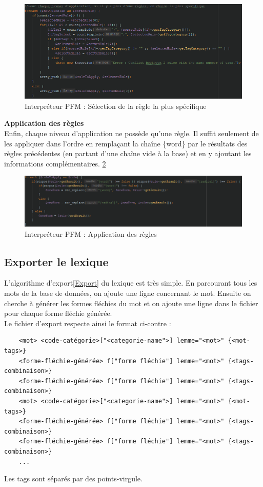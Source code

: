 \documentclass[12pt,a4paper]{article}
\begin{document}
\begin{figure}[h]
\centering
\includegraphics[width=150mm]{img/interpreteur_selection.PNG}
\caption{Interpréteur PFM : Sélection de la règle la plus spécifique}
\label{PFM5}
\end{figure}

\textbf{Application des règles} \\
Enfin, chaque niveau d'application ne possède qu'une règle. Il suffit seulement de les appliquer dans l'ordre en remplaçant la chaîne \{word\} par le résultats des règles précédentes (en partant d'une chaîne vide à la base) et en y ajoutant les informations complémentaires. \ref{PFM6}

\begin{figure}[h]
\centering
\includegraphics[width=150mm]{img/interpreteur_application.PNG}
\caption{Interpréteur PFM : Application des règles}
\label{PFM6}
\end{figure}


\subsection{Exporter le lexique}

L'algorithme d'export\ref{Export} du lexique est très simple. En parcourant tous les mots de la base de données, on ajoute une ligne concernant le mot. Ensuite on cherche à générer les formes fléchies du mot et on ajoute une ligne dans le fichier pour chaque forme fléchie générée. \\
Le fichier d'export respecte ainsi le format ci-contre :
\begin{verbatim}
    <mot> <code-catégorie>["<categorie-name">] lemme="<mot>" {<mot-tags>}
    <forme-fléchie-générée> f["forme fléchie"] lemme="<mot>" {<tags-combinaison>}
    <forme-fléchie-générée> f["forme fléchie"] lemme="<mot>" {<tags-combinaison>}
    <mot> <code-catégorie>["<categorie-name">] lemme="<mot>" {<mot-tags>}
    <forme-fléchie-générée> f["forme fléchie"] lemme="<mot>" {<tags-combinaison>}
    <forme-fléchie-générée> f["forme fléchie"] lemme="<mot>" {<tags-combinaison>}
    ...
\end{verbatim}
Les tags sont séparés par des points-virgule.
\end{document}
